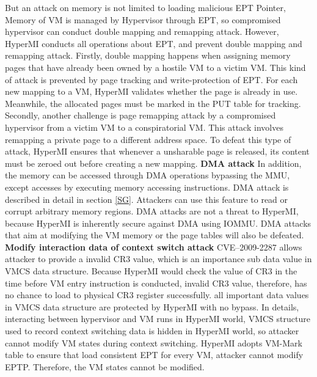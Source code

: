 \documentclass[conference]{IEEEtran}
\begin{document}
But an attack on memory is not limited to loading malicious EPT Pointer, 
Memory of VM is managed by Hypervisor through EPT, so compromised hypervisor can conduct double mapping and remapping attack. However, HyperMI conducts all operations about EPT, and prevent double mapping and remapping attack.
Firstly, double mapping happens when assigning memory pages that have already been owned by a hostile VM to a victim VM. This kind of attack is prevented by page tracking and write-protection of EPT. For each new mapping to a VM, HyperMI validates whether the page is already in use. Meanwhile, the allocated pages must be marked in the PUT table for tracking. Secondly, another challenge is page remapping attack by a compromised hypervisor from a victim VM to a conspiratorial VM. This attack involves remapping a private page to a different address space. To defeat this type of attack, HyperMI ensures that whenever a unsharable page is released, its content must be zeroed out before creating a new mapping.
\textbf{DMA attack}
In addition, the memory can be accessed through DMA operations bypassing the MMU, except accesses by executing memory accessing instructions. DMA attack is described in detail in section \ref{SG}. Attackers can use this feature to read or corrupt arbitrary memory regions. DMA attacks are not a threat to HyperMI, because HyperMI is inherently secure against DMA using IOMMU. DMA attacks that aim at modifying the VM memory or the page tables will also be defeated.
\textbf{Modify interaction data of context switch attack}
CVE--2009-2287 allows attacker to provide a invalid CR3 value, which is an importance sub data value in VMCS data structure. Because HyperMI would check the value of CR3 in the time before VM entry instruction is conducted, invalid CR3 value, therefore, has no chance to load to physical CR3 register successfully. all important data values in VMCS data structure are protected by HyperMI with no bypass. In details, 
interacting between hypervisor and VM runs in HyperMI world, VMCS structure used to record context switching data is hidden in HyperMI world, so attacker cannot modify VM states during context switching. HyperMI adopts VM-Mark table to ensure that load consistent EPT for every VM, attacker cannot modify EPTP. Therefore, the VM states cannot be modified.
\end{document}
